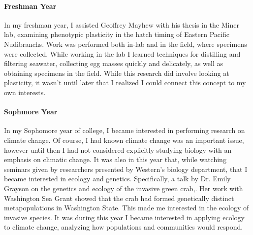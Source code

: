 \documentclass[letterpaper]{article}
\begin{document}
\paragraph{Freshman Year}
In my freshman year, I assisted Geoffrey Mayhew with his thesis in the Miner lab, 
examining phenotypic plasticity in the hatch timing of Eastern Pacific Nudibranchs. Work was
 performed both in-lab and in the field, where specimens were collected.  While working in the lab 
I learned techniques for distilling and filtering seawater, collecting egg masses 
quickly and delicately, as well as obtaining specimens in the field.
While this research did involve looking at plasticity, it wasn't until later that I realized I could connect 
this concept to my own interests. 

\newpage

\paragraph{Sophmore Year}
In my Sophomore year of college, I became interested in performing research on climate change. Of course, I had known climate change was an important issue,
however until then I had not considered explicitly studying biology with an emphasis on climatic change. It was also in this year that, while watching seminars given by researchers
presented by Western's biology department, that I became interested in ecology and genetics. Specifically, a talk by Dr. Emily Grayson
on the genetics and ecology of the invasive green crab,. Her work with Washington Sea Grant showed that the crab
had formed genetically distinct metapopulations in Washington State. This made me interested in the ecology of invasive species.
It was during this year I became interested in applying ecology to climate change, analyzing how populations and communities would respond.
\end{document}
